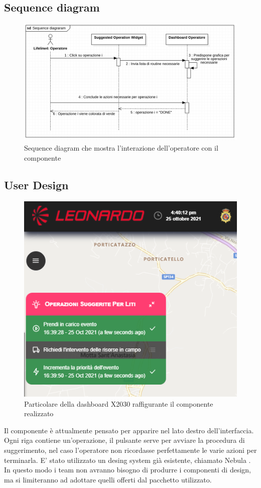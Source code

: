 \subsection{Sequence diagram}

\begin{figure}[H]
    \centering
    \includegraphics[width=150mm]{img/sequence}
    \caption{Sequence diagram che mostra l'interazione dell'operatore con il componente}
  \end{figure}

\subsection{User Design}
\begin{figure}[H]
    \centering
    \includegraphics[width=140mm]{img/screenshotGUIzoom}
    \caption{Particolare della dashboard X2030 raffigurante il componente realizzato}
  \end{figure}
Il componente è attualmente pensato per apparire nel lato destro dell'interfaccia.
Ogni riga contiene un'operazione, il pulsante serve per avviare la procedura di suggerimento, nel caso 
l'operatore non ricordasse perfettamente le varie azioni per terminarla.
E' stato utilizzato un desing system già esistente, chiamato Nebula \cite{nebula}.
In questo modo i team non avranno bisogno di produrre i componenti di design, ma si limiteranno ad adottare
quelli offerti dal pacchetto utilizzato.

